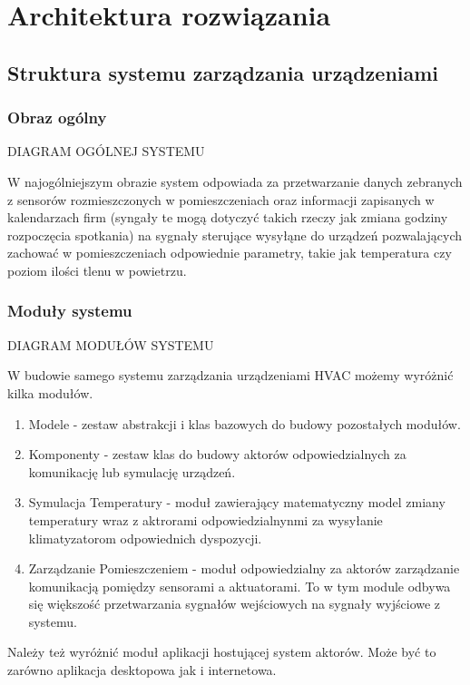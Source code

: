 \chapter{Architektura rozwiązania}
\section{Struktura systemu zarządzania urządzeniami}
\subsection{Obraz ogólny}
DIAGRAM OGÓLNEJ SYSTEMU
% 

W najogólniejszym obrazie system odpowiada za przetwarzanie danych zebranych z sensorów rozmieszczonych w pomieszczeniach oraz informacji zapisanych w kalendarzach firm (syngały te mogą dotyczyć takich rzeczy jak zmiana godziny rozpoczęcia spotkania)
na sygnały sterujące wysyłąne do urządzeń pozwalających zachować w pomieszczeniach odpowiednie parametry, takie jak temperatura czy poziom ilości tlenu w powietrzu.

\subsection{Moduły systemu}
DIAGRAM MODUŁÓW SYSTEMU
% 

W budowie samego systemu zarządzania urządzeniami HVAC możemy wyróżnić kilka modułów.
\begin{enumerate}
    \item Modele - zestaw abstrakcji i klas bazowych do budowy pozostałych modułów.  
    \item Komponenty - zestaw klas do budowy aktorów odpowiedzialnych za komunikację lub symulację urządzeń.
    \item Symulacja Temperatury - moduł zawierający matematyczny model zmiany temperatury wraz z aktrorami odpowiedzialnynmi za wysyłanie klimatyzatorom odpowiednich dyspozycji.
    \item Zarządzanie Pomieszczeniem - moduł odpowiedzialny za aktorów zarządzanie komunikacją pomiędzy sensorami a aktuatorami. 
    To w tym module odbywa się większość przetwarzania sygnałów wejściowych na sygnały wyjściowe z systemu. 
\end{enumerate}

Należy też wyróżnić moduł aplikacji hostującej system aktorów. 
Może być to zarówno aplikacja desktopowa jak i internetowa. 

